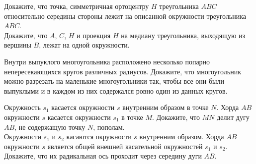 \begin{problems}
\item
\sbp
Докажите, что точка, симметричная ортоцентру $H$ треугольника $ABC$
относительно середины стороны лежит на описанной окружности треугольника $ABC$.
\\
\sbp
Докажите, что $A$, $C$, $H$ и проекция $H$ на медиану треугольника, выходящую
из вершины $B$, лежат на одной окружности.

\item
Внутри выпуклого многоугольника расположено несколько попарно непересекающихся
кругов различных радиусов.
Докажите, что многоугольник можно разрезать на маленькие многоугольники так,
чтобы все они были выпуклыми и в каждом из них содержался ровно один из данных
кругов.

\item
\sbp
Окружность $s_1$ касается окружности $s$ внутренним образом в точке $N$.
Хорда $AB$ окружности $s$ касается окружности $s_1$ в точке $M$.
Докажите, что $MN$ делит дугу $AB$, не содержащую точку $N$, пополам.
\\
\sbp
Окружности $s_1$ и $s_2$ касаются окружности $s$ внутренним образом.
Хорда $AB$ окружности $s$ является общей внешней касательной окружностей $s_1$
и $s_2$.
Докажите, что их радикальная ось проходит через середину дуги $AB$.

\end{problems}

